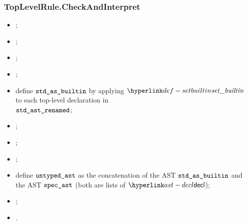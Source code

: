 \subsubsection{TopLevelRule.CheckAndInterpret\label{sec:TopLevelRule.CheckAndInterpret}}
\ProseParagraph
\AllApply
\begin{itemize}
    \item \Proseaslscan{$\vstdtext$}{$\spectoken$}{$\vstdtokens$\ProseTerminateAs{\LexicalErrorConfig}};
    \item \Proseaslparse{$\vstdtokens$}{$\vstdparse$\ProseTerminateAs{\ParseErrorConfig}};
    \item \Prosebuildast{$\vstdparse$}{$\vstdast$\ProseTerminateAs{\BuildErrorConfig}};
    \item \Proserenamelocals{\vstdast}{\vstdastrenamed};
    \item define $\texttt{std\_as\_builtin}$ by applying $\setbuiltin$ to each top-level declaration in\\
          $\texttt{std\_ast\_renamed}$\ProseTerminateAs{\BuildErrorConfig};
    \item \Proseaslscan{$\vspectext$}{$\spectoken$}{$\vspectokens$\ProseTerminateAs{\LexicalErrorConfig}};
    \item \Proseaslparse{$\vspectokens$}{$\vspecparse$\ProseTerminateAs{\ParseErrorConfig}};
    \item \Prosebuildast{$\vspecparse$}{$\vspecast$\ProseTerminateAs{\BuildErrorConfig}};
    \item define $\texttt{untyped\_ast}$ as the concatenation of the AST $\texttt{std\_as\_builtin}$ and
          the AST $\vspecast$ (both are lists of $\decl$);
    \item {};
    \item {}.
\end{itemize}

